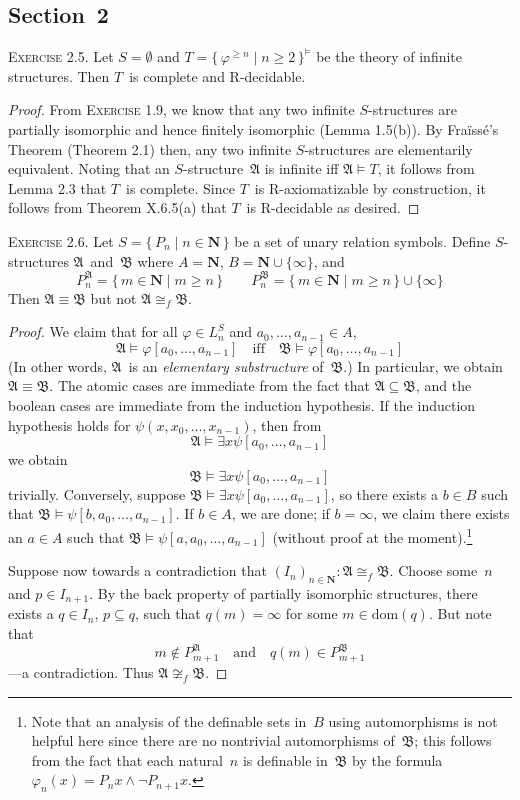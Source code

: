 \documentclass[letterpaper]{article}
\newcommand{\N}{\mathbf{N}}
\newcommand{\iso}{\cong}
\newcommand{\union}{\cup}
\newcommand{\A}{\mathfrak{A}}
\newcommand{\B}{\mathfrak{B}}
\newcommand{\fiso}{\iso_f}
\newcommand{\dom}{\mathrm{dom}}
\theoremstyle{remark}
\begin{document}
\subsection*{Section~2}
\noindent\textsc{Exercise 2.5.}
Let $S=\emptyset$ and $T=\{\,\varphi^{\ge n}\mid n\ge 2\,\}^{\models}$ be the theory of infinite structures. Then $T$~is complete and R-decidable.
\begin{proof}
From \textsc{Exercise 1.9}, we know that any two infinite $S$-structures are partially isomorphic and hence finitely isomorphic (Lemma 1.5(b)). By Fra\"iss\'e's Theorem (Theorem 2.1) then, any two infinite $S$-structures are elementarily equivalent. Noting that an $S$-structure~$\A$ is infinite iff $\A\models T$, it follows from Lemma 2.3 that $T$~is complete. Since $T$~is R-axiomatizable by construction, it follows from Theorem X.6.5(a) that $T$~is R-decidable as desired.
\end{proof}
\noindent\textsc{Exercise 2.6.}
Let $S=\{\,P_n\mid n\in\N\,\}$ be a set of unary relation symbols. Define $S$-structures $\A$~and~$\B$ where $A=\N$, $B=\N\union\{\infty\}$, and
$$P_n^{\A}=\{\,m\in\N\mid m\ge n\,\}\qquad P_n^{\B}=\{\,m\in\N\mid m\ge n\,\}\union\{\infty\}$$
Then $\A\equiv\B$ but not $\A\fiso\B$.
\begin{proof}
We claim that for all $\varphi\in L_n^S$ and $a_0,\ldots,a_{n-1}\in A$,
$$\A\models\varphi[a_0,\ldots,a_{n-1}]\quad\text{iff}\quad\B\models\varphi[a_0,\ldots,a_{n-1}]$$
(In other words, $\A$~is an \emph{elementary substructure} of~$\B$.) In particular, we obtain $\A\equiv\B$. The atomic cases are immediate from the fact that $\A\subseteq\B$, and the boolean cases are immediate from the induction hypothesis. If the induction hypothesis holds for $\psi(x,x_0,\ldots,x_{n-1})$, then from $$\A\models\exists x\psi[a_0,\ldots,a_{n-1}]$$ we obtain $$\B\models\exists x\psi[a_0,\ldots,a_{n-1}]$$ trivially. Conversely, suppose $\B\models\exists x\psi[a_0,\ldots,a_{n-1}]$, so there exists a $b\in B$ such that $\B\models\psi[b,a_0,\ldots,a_{n-1}]$. If $b\in A$, we are done; if $b=\infty$, we claim there exists an $a\in A$ such that $\B\models\psi[a,a_0,\ldots,a_{n-1}]$ (without proof at the moment).\footnote{Note that an analysis of the definable sets in~$B$ using automorphisms is not helpful here since there are no nontrivial automorphisms of~$\B$; this follows from the fact that each natural~$n$ is definable in~$\B$ by the formula $\varphi_n(x)=P_n x\land\lnot P_{n+1}x$.}

Suppose now towards a contradiction that $(I_n)_{n\in\N}:\A\fiso\B$. Choose some~$n$ and $p\in I_{n+1}$. By the back property of partially isomorphic structures, there exists a $q\in I_n$, $p\subseteq q$, such that $q(m)=\infty$ for some $m\in\dom(q)$. But note that
$$m\not\in P_{m+1}^{\A}\quad\text{and}\quad q(m)\in P_{m+1}^{\B}$$
---a contradiction. Thus $\A\not\fiso\B$.
\end{proof}
\end{document}
